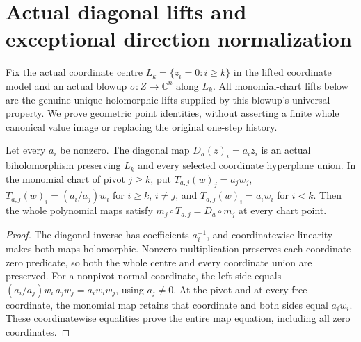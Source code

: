\section{Actual diagonal lifts and exceptional direction normalization}
\label{sec:hironaka-normal-crossings-diagonal-lift-orbits}

Fix the actual coordinate centre $L_k=\{z_i=0:i\geq k\}$ in the
lifted coordinate model and an actual blowup $\sigma:Z\to\mathbb C^n$
along $L_k$. All monomial-chart lifts below are the genuine unique
holomorphic lifts supplied by this blowup's universal property. We
prove geometric point identities, without asserting a finite whole
canonical value image or replacing the original one-step history.

\begin{lemma}
\label{hir:general-nc-diagonal-monomial-chart-equation}
\leanok
{}
Let every $a_i$ be nonzero. The diagonal map $D_a(z)_i=a_i z_i$ is an
actual biholomorphism preserving $L_k$ and every selected coordinate
hyperplane union. In the monomial chart of pivot $j\geq k$, put
$T_{a,j}(w)_j=a_jw_j$, $T_{a,j}(w)_i=(a_i/a_j)w_i$ for $i\geq k$, $i\ne j$,
and $T_{a,j}(w)_i=a_iw_i$ for $i<k$. Then the whole polynomial maps satisfy
$m_j\circ T_{a,j}=D_a\circ m_j$ at every chart point.
\end{lemma}
\begin{proof}
The diagonal inverse has coefficients $a_i^{-1}$, and coordinatewise
linearity makes both maps holomorphic. Nonzero multiplication preserves
each coordinate zero predicate, so both the whole centre and every
coordinate union are preserved. For a nonpivot normal coordinate, the
left side equals $(a_i/a_j)w_i\,a_jw_j=a_iw_iw_j$, using $a_j\ne0$.
At the pivot and at every free coordinate, the monomial map retains
that coordinate and both sides equal $a_iw_i$. These coordinatewise
equalities prove the entire map equation, including all zero coordinates.
\end{proof}



